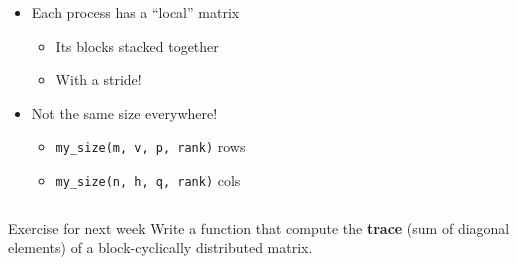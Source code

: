 \documentclass[xcolor={rgb,x11names,svgnames},rgb,x11names,svgnames]{beamer}
\begin{document}
\begin{frame}[label=block-cyclic, fragile]
\begin{columns}
\begin{column}{6.5cm}
\begin{itemize}
  \item Each process has a ``local'' matrix
    \begin{itemize}
    \item Its blocks stacked together
    \item With a stride!
    \end{itemize}
  \item Not the same size everywhere!
    \begin{itemize}
    \item {\footnotesize \texttt{my_size(m, v, p, rank)}} rows
    \item {\footnotesize\texttt{my_size(n, h, q, rank)}} cols
    \end{itemize}
  \end{itemize}
\end{column}
\end{columns}

  \begin{alertblock}{Exercise for next week}
    Write a function that compute the \textbf{trace} (sum of diagonal elements)
    of a block-cyclically distributed matrix.
  \end{alertblock}

\end{frame}


\end{document}
